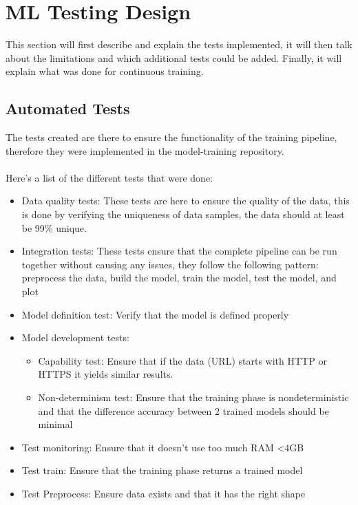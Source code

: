 \section{ML Testing Design}

This section will first describe and explain the tests implemented, it will then talk about the limitations and which additional tests could be added. Finally, it will explain what was done for continuous training.

\subsection{Automated Tests}
The tests created are there to ensure the functionality of the training pipeline, therefore they were implemented in the model-training repository.
\\\\
Here's a list of the different tests that were done:
\begin{itemize}
    \item Data quality tests: These tests are here to ensure the quality of the data, this is done by verifying the uniqueness of data samples, the data should at least be 99\% unique.
    \item Integration tests: These tests ensure that the complete pipeline can be run together without causing any issues, they follow the following pattern: preprocess the data, build the model, train the model, test the model, and plot
    \item Model definition test: Verify that the model is defined properly
    \item Model development tests:
    \begin{itemize}
        \item Capability test: Ensure that if the data (URL) starts with HTTP or HTTPS it yields similar results.
        \item Non-determinism test: Ensure that the training phase is nondeterministic and that the difference accuracy between 2 trained models should be minimal
    \end{itemize}

    \item Test monitoring: Ensure that it doesn't use too much RAM <4GB
    \item Test train: Ensure that the training phase returns a trained model
    \item Test Preprocess: Ensure data exists and that it has the right shape 
\end{itemize}

